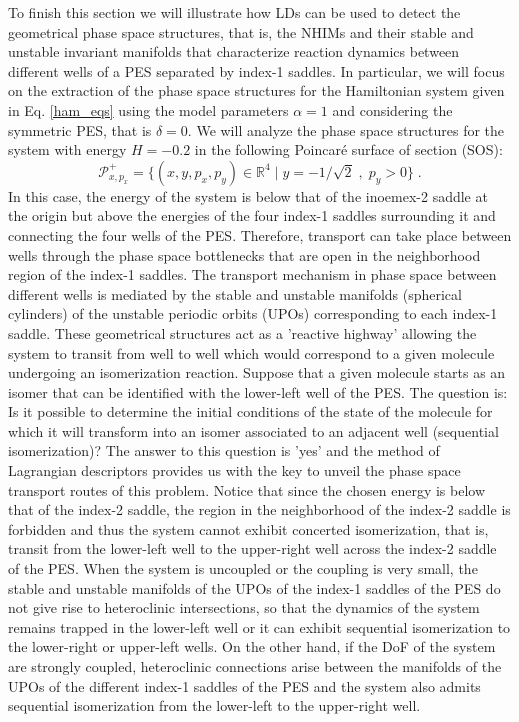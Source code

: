 \documentclass[9pt]{article}
\begin{document}
To finish this section we will illustrate how LDs can be used to detect the geometrical phase space structures, that is, the NHIMs and their stable and unstable invariant manifolds that characterize reaction dynamics between different wells of a PES separated by index-1 saddles. In particular, we will focus on the extraction of the phase space structures for the Hamiltonian system given in Eq. \eqref{ham_eqs} using the model parameters $\alpha = 1$ and considering the symmetric PES, that is $\delta = 0$. We will analyze the phase space structures for the system with energy $H = -0.2$ in the following Poincar\'e surface of section (SOS):
\begin{equation}
\mathcal{P}^{+}_{x,p_x} = \lbrace (x,y,p_x,p_y) \in \mathbb{R}^4 \;|\; y = -1/\sqrt{2} \; ,\; p_y > 0 \rbrace \;.
\label{psos_ld}
\end{equation}
In this case, the energy of the system is below that of the inoemex-2 saddle at the origin but above the energies of the four index-1 saddles surrounding it and connecting the four wells of the PES. Therefore, transport can take place between wells through the phase space bottlenecks that are open in the neighborhood region of the index-1 saddles. The transport mechanism in phase space between different wells is mediated by the stable and unstable manifolds (spherical cylinders) of the unstable periodic orbits (UPOs) corresponding to each index-1 saddle. These geometrical structures act as a 'reactive highway' allowing the system to transit from well to well which would correspond to a given molecule undergoing an isomerization reaction. Suppose that a given molecule starts as an isomer that can be identified with the lower-left well of the PES. The question is: Is it possible to determine the initial conditions of the state of the molecule for which it will transform  into an isomer associated to an adjacent well (sequential isomerization)? The answer to this question is 'yes' and the method of Lagrangian descriptors provides us with the key to unveil the phase space transport routes of this problem. 
Notice that since the chosen energy is below that of the index-2 saddle, the region in the neighborhood of the index-2 saddle is forbidden and thus the system cannot exhibit concerted isomerization, that is, transit from the lower-left well to the upper-right well across the index-2 saddle of the PES. When the system is uncoupled or the coupling is very small, the stable and unstable manifolds of the UPOs of the index-1 saddles of the PES do not give rise to heteroclinic intersections, so that the dynamics of the system remains trapped in the lower-left well or it can exhibit sequential isomerization to the lower-right or upper-left wells. On the other hand, if the DoF of the system are strongly coupled, heteroclinic connections arise between the manifolds of the UPOs of the different index-1 saddles of the PES and the system also admits sequential isomerization from the lower-left to the upper-right well. 
\end{document}
